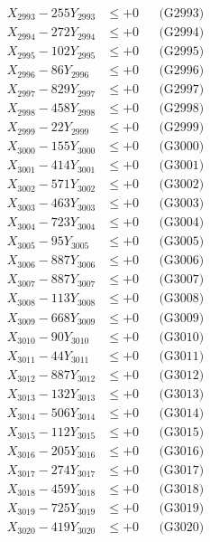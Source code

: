 \documentclass[a4paper,10pt]{article}
\begin{document}
{\begin{align}
X_{2993} - 255Y_{2993} &\leq +0 && \text{(G2993)} \\
X_{2994} - 272Y_{2994} &\leq +0 && \text{(G2994)} \\
X_{2995} - 102Y_{2995} &\leq +0 && \text{(G2995)} \\
X_{2996} - 86Y_{2996} &\leq +0 && \text{(G2996)} \\
X_{2997} - 829Y_{2997} &\leq +0 && \text{(G2997)} \\
X_{2998} - 458Y_{2998} &\leq +0 && \text{(G2998)} \\
X_{2999} - 22Y_{2999} &\leq +0 && \text{(G2999)} \\
X_{3000} - 155Y_{3000} &\leq +0 && \text{(G3000)} \\
\allowbreak
X_{3001} - 414Y_{3001} &\leq +0 && \text{(G3001)} \\
X_{3002} - 571Y_{3002} &\leq +0 && \text{(G3002)} \\
X_{3003} - 463Y_{3003} &\leq +0 && \text{(G3003)} \\
X_{3004} - 723Y_{3004} &\leq +0 && \text{(G3004)} \\
X_{3005} - 95Y_{3005} &\leq +0 && \text{(G3005)} \\
X_{3006} - 887Y_{3006} &\leq +0 && \text{(G3006)} \\
X_{3007} - 887Y_{3007} &\leq +0 && \text{(G3007)} \\
X_{3008} - 113Y_{3008} &\leq +0 && \text{(G3008)} \\
X_{3009} - 668Y_{3009} &\leq +0 && \text{(G3009)} \\
X_{3010} - 90Y_{3010} &\leq +0 && \text{(G3010)} \\
\allowbreak
X_{3011} - 44Y_{3011} &\leq +0 && \text{(G3011)} \\
X_{3012} - 887Y_{3012} &\leq +0 && \text{(G3012)} \\
X_{3013} - 132Y_{3013} &\leq +0 && \text{(G3013)} \\
X_{3014} - 506Y_{3014} &\leq +0 && \text{(G3014)} \\
X_{3015} - 112Y_{3015} &\leq +0 && \text{(G3015)} \\
X_{3016} - 205Y_{3016} &\leq +0 && \text{(G3016)} \\
X_{3017} - 274Y_{3017} &\leq +0 && \text{(G3017)} \\
X_{3018} - 459Y_{3018} &\leq +0 && \text{(G3018)} \\
X_{3019} - 725Y_{3019} &\leq +0 && \text{(G3019)} \\
X_{3020} - 419Y_{3020} &\leq +0 && \text{(G3020)} \\

\end{align}}
\end{document}
